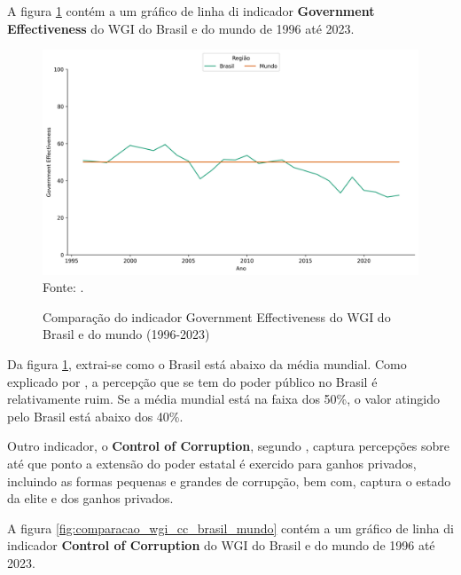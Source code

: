 A figura \ref{fig:comparacao_wgi_ge_brasil_mundo} contém a um gráfico de linha di indicador \textbf{Government Effectiveness} do WGI do Brasil e do mundo de 1996 até 2023.

\begin{figure}[H]
	\centering
	\caption{Comparação do indicador Government Effectiveness do WGI do Brasil e do mundo (1996-2023)}
	\includegraphics[width=1\linewidth]{figuras/comparacao_wgi_ge_brasil_mundo}
	\label{fig:comparacao_wgi_ge_brasil_mundo}
	\footnotesize{Fonte: \cite{wgi_dados}.}
\end{figure}

Da figura \ref{fig:comparacao_wgi_ge_brasil_mundo}, extrai-se como o Brasil está abaixo da média mundial. Como explicado por \cite{kaufmann2024worldwide}, a percepção que se tem do poder público no Brasil é relativamente ruim. Se a média mundial está na faixa dos 50\%, o valor atingido pelo Brasil está abaixo dos 40\%.

Outro indicador, o \textbf{Control of Corruption}, segundo \cite{kaufmann2024worldwide}, captura percepções sobre até que ponto a extensão do poder estatal é exercido para ganhos privados, incluindo as formas pequenas e grandes de corrupção, bem com, captura o estado da elite e dos ganhos privados.

A figura \ref{fig:comparacao_wgi_cc_brasil_mundo} contém a um gráfico de linha di indicador \textbf{Control of Corruption} do WGI do Brasil e do mundo de 1996 até 2023.

